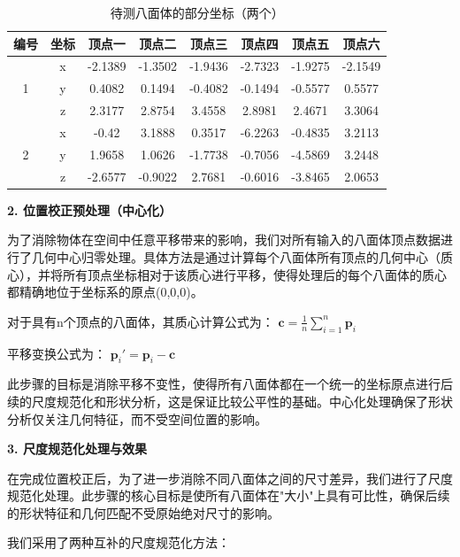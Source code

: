 \begin{table}[H]
\centering
\caption{待测八面体的部分坐标（两个）}
\label{tab:octahedra_test}
\begin{tabular}{|c|c|c|c|c|c|c|c|} 
\hline
编号                 & 坐标 & 顶点一     & 顶点二     & 顶点三     & 顶点四     & 顶点五     & 顶点六      \\ 
\hline
\multirow{3}{*}{1} & x  & -2.1389 & -1.3502 & -1.9436 & -2.7323 & -1.9275 & -2.1549  \\ 
\cline{2-8}
                   & y  & 0.4082  & 0.1494  & -0.4082 & -0.1494 & -0.5577 & 0.5577   \\ 
\cline{2-8}
                   & z  & 2.3177  & 2.8754  & 3.4558  & 2.8981  & 2.4671  & 3.3064   \\ 
\hline
\multirow{3}{*}{2} & x  & -0.42   & 3.1888  & 0.3517  & -6.2263 & -0.4835 & 3.2113   \\ 
\cline{2-8}
                   & y  & 1.9658  & 1.0626  & -1.7738 & -0.7056 & -4.5869 & 3.2448   \\ 
\cline{2-8}
                   & z  & -2.6577 & -0.9022 & 2.7681  & -0.6016 & -3.8465 & 2.0653   \\
\hline
\end{tabular}
\end{table}
    
    \textbf{2. 位置校正预处理（中心化）}
    
    为了消除物体在空间中任意平移带来的影响，我们对所有输入的八面体顶点数据进行了几何中心归零处理。具体方法是通过计算每个八面体所有顶点的几何中心（质心），并将所有顶点坐标相对于该质心进行平移，使得处理后的每个八面体的质心都精确地位于坐标系的原点(0,0,0)。
    
    对于具有n个顶点的八面体，其质心计算公式为：
    $\mathbf{c} = \frac{1}{n}\sum_{i=1}^{n}\mathbf{p}_i$
    
    平移变换公式为：
    $\mathbf{p}_i' = \mathbf{p}_i - \mathbf{c}$
    
    此步骤的目标是消除平移不变性，使得所有八面体都在一个统一的坐标原点进行后续的尺度规范化和形状分析，这是保证比较公平性的基础。中心化处理确保了形状分析仅关注几何特征，而不受空间位置的影响。
    
    \textbf{3. 尺度规范化处理与效果}
    
    在完成位置校正后，为了进一步消除不同八面体之间的尺寸差异，我们进行了尺度规范化处理。此步骤的核心目标是使所有八面体在"大小"上具有可比性，确保后续的形状特征和几何匹配不受原始绝对尺寸的影响。
    
    我们采用了两种互补的尺度规范化方法：
    

